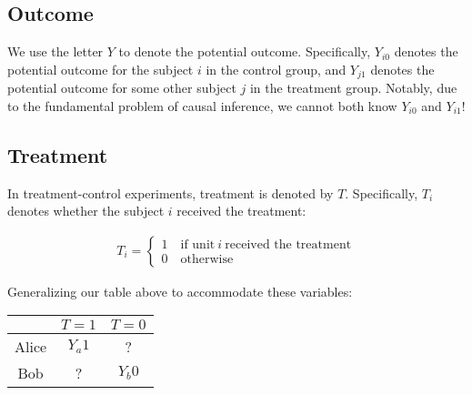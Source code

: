 \documentclass{article}
\begin{document}
\subsection{Outcome}
We use the letter $Y$ to denote the potential outcome.
Specifically, $Y_{i0}$ denotes the potential outcome for the subject $i$ in the control group, and $Y_{j1}$ denotes the potential outcome for some other subject $j$ in the treatment group.
Notably, due to the fundamental problem of causal inference, we cannot both know $Y_{i0}$ and $Y_{i1}$!

\subsection{Treatment}
In treatment-control experiments, treatment is denoted by $T$.
Specifically, $T_i$ denotes whether the subject $i$ received the treatment:
\begin{center}
    \begin{gather*}
        T_i =
        \begin{cases}
            1 \quad \text{if unit} \ i \ \text{received the treatment} \\
            0 \quad \text{otherwise}
        \end{cases}
    \end{gather*}
\end{center}
Generalizing our table above to accommodate these variables:
\begin{center}
    \begin{tabular}{|c|c|c|}
         \hline
          & $T = 1$ & $T=0$ \\
         \hline
         Alice & $Y_a1$ & ? \\
         \hline
         Bob & ? & $Y_b0$ \\
         \hline
    \end{tabular}
\end{center}
\end{document}
